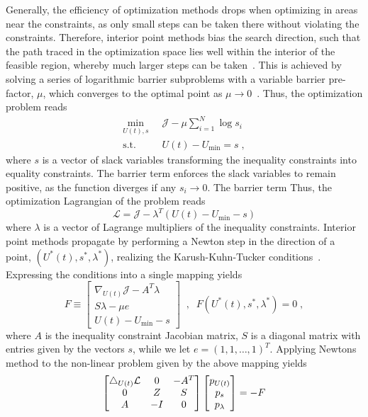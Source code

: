 Generally, the efficiency of optimization methods drops when optimizing in areas near the constraints, as only small steps can be taken there without violating the constraints. Therefore, interior point methods bias the search direction, such that the path traced in the optimization space lies well within the interior of the feasible region, whereby much larger steps can be taken~\cite{NocedalWright2006}. This is achieved by solving a series of logarithmic barrier subproblems with a variable barrier pre-factor, $\mu$, which converges to the optimal point as $\mu \to 0$~\cite{Byrd1997,Fiacco1990}. Thus, the optimization problem reads  
 \begin{align*}
	\min_{U(t) , s} \; & \; \mathcal{J} - \mu \sum_{i=1}^{N} \log s_i \\
	\text{s.t.}  \; & \; U(t) - U_{\mathrm{min}} = s  \; , 
\end{align*}
where $s$ is a vector of slack variables transforming the inequality constraints into equality constraints. The barrier term enforces the slack variables to remain positive, as the function diverges if any $s_i \to 0$. The barrier term 
Thus, the optimization Lagrangian of the problem reads
\begin{equation}
	\mathcal{L} = \mathcal{J} - \lambda ^T (U(t) - U_{\mathrm{min}} - s)
\end{equation}
where $\lambda$ is a vector of Lagrange multipliers of the inequality constraints.
Interior point methods propagate by performing a Newton step in the direction of a point, $(U^*(t), s^*, \lambda ^*)$, realizing the Karush-Kuhn-Tucker conditions~\cite{NocedalWright2006,Kuhn2014}. Expressing the conditions into a single mapping yields
\begin{equation}
	F \equiv 
	\begin{bmatrix}
  \nabla_{U(t)} \mathcal{J} - A^{T} \lambda  \\
  S \lambda - \mu e \\
  U(t) - U_{\mathrm{min}} - s 
  \end{bmatrix}
  \; \; , \; \; F(U^*(t), s^*, \lambda ^*) = 0 \; ,
\end{equation}
where $A$ is the inequality constraint Jacobian matrix, $S$ is a diagonal matrix with entries given by the vectors $s$, while we let $e = (1 ,1 , \ldots , 1 )^T$.
Applying Newtons method to the non-linear problem given by the above mapping yields
\begin{equation}
  \begin{bmatrix}
  \mathop{}\!\mathbin\bigtriangleup_{U(t)} \mathcal{L} 	& 0 	& -A^{T}	\\
  0 						& Z 			& S 			\\
  A 					& -I			& 0				 
  \end{bmatrix}  
  \begin{bmatrix}
  p_{U(t)} \\ p_s \\ p_{\lambda} 
  \end{bmatrix}
  = - F
\end{equation}

